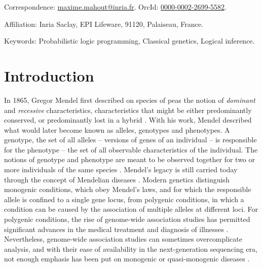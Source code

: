 \documentclass{eptcs}
\begin{document}
\vspace{5pt}

Correspondence: {\href{email:maxime.mahout@inria.fr}{maxime.mahout@inria.fr}. OrcId: \href{https://orcid.org/0000-0002-2699-5582}{0000-0002-2699-5582}}. 

Affiliation: {{Inria Saclay}, {EPI Lifeware}, {{91120}, {Palaiseau}, {France}}}.

Keywords: Probabilistic logic programming, Classical genetics, Logical inference.


\section*{Introduction}

In 1865, Gregor Mendel first described on species of peas the notion of \textit{dominant} and \textit{recessive} characteristics, characteristics that might be either predominantly conserved, or predominantly lost in a hybrid \cite{mendel_versuche_1865}. With his work, Mendel described what would later become known as alleles, genotypes and phenotypes. A genotype, the set of all alleles -- versions of genes of an individual -- is responsible for the phenotype -- the set of all observable characteristics of the individual. The notions of genotype and phenotype are meant to be observed together for two or more individuals of the same species \cite{orgogozo_differential_2015}. Mendel's legacy is still carried today through the concept of Mendelian diseases \cite{botstein_discovering_2003}. Modern genetics distinguish monogenic conditions, which obey Mendel's laws, and for which the responsible allele is confined to a single gene locus, from polygenic conditions, in which a condition can be caused by the association of multiple alleles at different loci. For polygenic conditions, the rise of genome-wide association studies has permitted significant advances in the medical treatment and diagnosis of illnesses \cite{visscher_five_2012}. Nevertheless, genome-wide association studies can sometimes overcomplicate analysis, and with their ease of availability in the next-generation sequencing era, not enough emphasis has been put on monogenic or quasi-monogenic diseases \cite{antonarakis_mendelian_2006, tam_benefits_2019}. %
\end{document}
